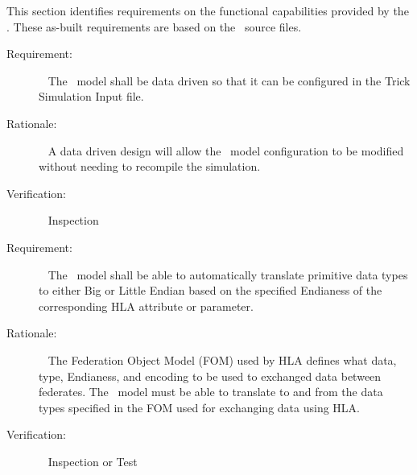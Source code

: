 \documentclass[twoside,11pt,titlepage]{report}
\begin{document}
This section identifies requirements on the functional capabilities
provided by the \TrickHLA. These as-built requirements are based
on the \TrickHLA\ source files.


\label{reqt:data_driven}
\begin{description}
  \item[Requirement:]\ \newline
    The \TrickHLA\ model shall be data driven so that it can be configured
    in the Trick Simulation Input file.

  \item[Rationale:]\ \newline
    A data driven design will allow the \TrickHLA\ model configuration
    to be modified without needing to recompile the simulation.

  \item[Verification:]\ \newline
    Inspection
\end{description}

\label{reqt:hla_endianess}
\begin{description}
  \item[Requirement:]\ \newline
    The \TrickHLA\ model shall be able to automatically translate
    primitive data types to either Big or Little Endian based on the
    specified Endianess of the corresponding HLA attribute or parameter.

  \item[Rationale:]\ \newline
    The Federation Object Model (FOM) used by HLA defines what data,
    type, Endianess, and encoding to be used to exchanged data
    between federates. The \TrickHLA\ model must be able to translate to
    and from the data types specified in the FOM used for exchanging data
    using HLA.

  \item[Verification:]\ \newline
    Inspection or Test
\end{description}
\end{document}

